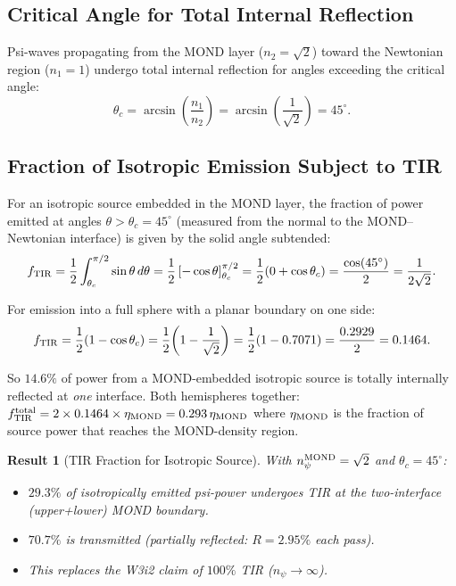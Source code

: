 \documentclass[aps,prd,twocolumn,superscriptaddress]{revtex4-2}
\newcommand{\npsi}{n_\psi}
\newtheorem{result}{Result}
\begin{document}
\subsection{Critical Angle for Total Internal Reflection}

Psi-waves propagating from the MOND layer ($n_2 = \sqrt{2}$) toward
the Newtonian region ($n_1 = 1$) undergo total internal reflection for
angles exceeding the critical angle:
\begin{equation}
\theta_c = \arcsin\!\left(\frac{n_1}{n_2}\right)
= \arcsin\!\left(\frac{1}{\sqrt{2}}\right) = 45^\circ.
\label{eq:theta-c}
\end{equation}

\subsection{Fraction of Isotropic Emission Subject to TIR}

For an isotropic source embedded in the MOND layer, the fraction of
power emitted at angles $\theta > \theta_c = 45^\circ$ (measured from
the normal to the MOND--Newtonian interface) is given by the solid angle
subtended:
\begin{equation}
f_{\rm TIR} = \frac{1}{2}\int_{\theta_c}^{\pi/2}\sin\theta\,d\theta
= \frac{1}{2}\left[-\cos\theta\right]_{\theta_c}^{\pi/2}
= \frac{1}{2}\!\left(0 + \cos\theta_c\right)
= \frac{\cos(45^\circ)}{2} = \frac{1}{2\sqrt{2}}.
\label{eq:f-TIR-one-side}
\end{equation}

For emission into a full sphere with a planar boundary on one side:
\begin{equation}
f_{\rm TIR} = \frac{1}{2}\!\left(1 - \cos\theta_c\right)
= \frac{1}{2}\!\left(1 - \frac{1}{\sqrt{2}}\right)
= \frac{1}{2}(1 - 0.7071) = \frac{0.2929}{2} = 0.1464.
\end{equation}

So $14.6\%$ of power from a MOND-embedded isotropic source is totally
internally reflected at \emph{one} interface.  Both hemispheres together:
$f_{\rm TIR}^{\rm total} = 2 \times 0.1464 \times \eta_{\rm MOND} = 0.293\,\eta_{\rm MOND}$
where $\eta_{\rm MOND}$ is the fraction of source power that reaches the
MOND-density region.

\begin{result}[TIR Fraction for Isotropic Source]
\label{res:TIR}
With $\npsi^{\rm MOND} = \sqrt{2}$ and $\theta_c = 45^\circ$:
\begin{itemize}
  \item $29.3\%$ of isotropically emitted psi-power undergoes TIR at
    the two-interface (upper+lower) MOND boundary.
  \item $70.7\%$ is transmitted (partially reflected: $R=2.95\%$ each pass).
  \item This replaces the W3i2 claim of $100\%$ TIR ($\npsi \to \infty$).
\end{itemize}
\end{result}
\end{document}

